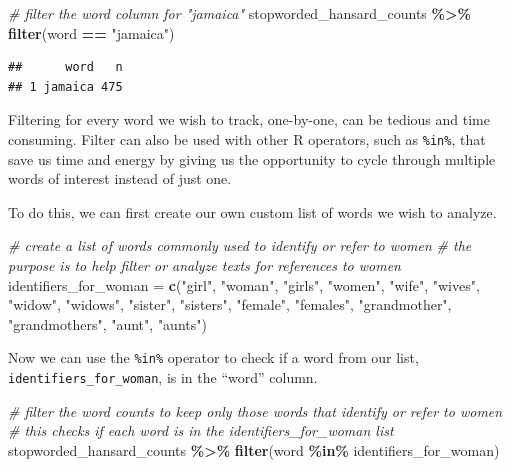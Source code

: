 \documentclass[
]{article}
\newenvironment{Shaded}{\begin{snugshade}}{\end{snugshade}}
\newcommand{\CommentTok}[1]{\textcolor[rgb]{0.56,0.35,0.01}{\textit{#1}}}
\newcommand{\FunctionTok}[1]{\textcolor[rgb]{0.13,0.29,0.53}{\textbf{#1}}}
\newcommand{\NormalTok}[1]{#1}
\newcommand{\OtherTok}[1]{\textcolor[rgb]{0.56,0.35,0.01}{#1}}
\newcommand{\SpecialCharTok}[1]{\textcolor[rgb]{0.81,0.36,0.00}{\textbf{#1}}}
\newcommand{\StringTok}[1]{\textcolor[rgb]{0.31,0.60,0.02}{#1}}
\begin{document}
\begin{Shaded}
\begin{Highlighting}[]
\CommentTok{\# filter the word column for "jamaica"}
\NormalTok{stopworded\_hansard\_counts }\SpecialCharTok{\%\textgreater{}\%} 
  \FunctionTok{filter}\NormalTok{(word }\SpecialCharTok{==} \StringTok{"jamaica"}\NormalTok{)}
\end{Highlighting}
\end{Shaded}

\begin{verbatim}
##      word   n
## 1 jamaica 475
\end{verbatim}

Filtering for every word we wish to track, one-by-one, can be tedious
and time consuming. Filter can also be used with other R operators, such
as \texttt{\%in\%}, that save us time and energy by giving us the
opportunity to cycle through multiple words of interest instead of just
one.

To do this, we can first create our own custom list of words we wish to
analyze.

\begin{Shaded}
\begin{Highlighting}[]
\CommentTok{\# create a list of words commonly used to identify or refer to women}
\CommentTok{\# the purpose is to help filter or analyze texts for references to women}
\NormalTok{identifiers\_for\_woman }\OtherTok{=} \FunctionTok{c}\NormalTok{(}\StringTok{"girl"}\NormalTok{, }\StringTok{"woman"}\NormalTok{, }\StringTok{"girls"}\NormalTok{, }\StringTok{"women"}\NormalTok{, }\StringTok{"wife"}\NormalTok{, }\StringTok{"wives"}\NormalTok{, }\StringTok{"widow"}\NormalTok{,}
                      \StringTok{"widows"}\NormalTok{, }\StringTok{"sister"}\NormalTok{, }\StringTok{"sisters"}\NormalTok{, }\StringTok{"female"}\NormalTok{, }\StringTok{"females"}\NormalTok{, }\StringTok{"grandmother"}\NormalTok{, }
                      \StringTok{"grandmothers"}\NormalTok{, }\StringTok{"aunt"}\NormalTok{, }\StringTok{"aunts"}\NormalTok{)}
\end{Highlighting}
\end{Shaded}

Now we can use the \texttt{\%in\%} operator to check if a word from our
list, \texttt{identifiers\_for\_woman}, is in the ``word'' column.

\begin{Shaded}
\begin{Highlighting}[]
\CommentTok{\# filter the word counts to keep only those words that identify or refer to women}
\CommentTok{\# this checks if each word is in the \textquotesingle{}identifiers\_for\_woman\textquotesingle{} list}
\NormalTok{stopworded\_hansard\_counts }\SpecialCharTok{\%\textgreater{}\%} 
  \FunctionTok{filter}\NormalTok{(word }\SpecialCharTok{\%in\%}\NormalTok{ identifiers\_for\_woman)}
\end{Highlighting}
\end{Shaded}
\end{document}
